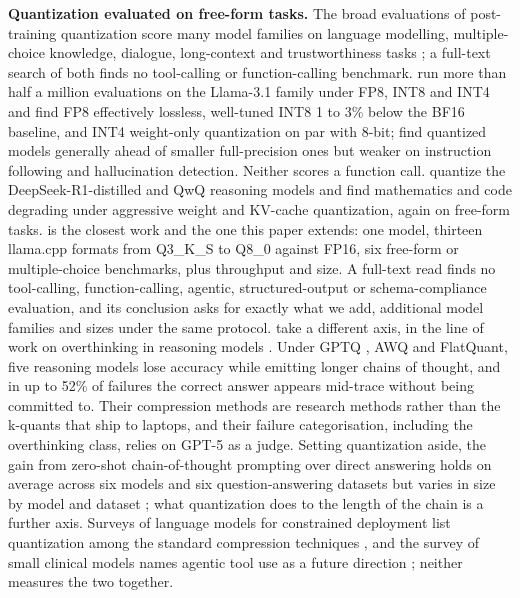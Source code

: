 \documentclass[12pt,letterpaper]{article}
\begin{document}
\textbf{Quantization evaluated on free-form tasks.} The broad evaluations of post-training quantization score many model families on language modelling, multiple-choice knowledge, dialogue, long-context and trustworthiness tasks \citep{jin2024comprehensive,li2024evaluating}; a full-text search of both finds no tool-calling or function-calling benchmark. \citet{kurtic2024bf16} run more than half a million evaluations on the Llama-3.1 family under FP8, INT8 and INT4 and find FP8 effectively lossless, well-tuned INT8 1 to 3\% below the BF16 baseline, and INT4 weight-only quantization on par with 8-bit; \citet{lee2024tradeoffs} find quantized models generally ahead of smaller full-precision ones but weaker on instruction following and hallucination detection. Neither scores a function call. \citet{liu2025quanthurts} quantize the DeepSeek-R1-distilled and QwQ reasoning models and find mathematics and code degrading under aggressive weight and KV-cache quantization, again on free-form tasks. \citet{kurt2026quant} is the closest work and the one this paper extends: one model, thirteen llama.cpp formats from Q3\_K\_S to Q8\_0 against FP16, six free-form or multiple-choice benchmarks, plus throughput and size. A full-text read finds no tool-calling, function-calling, agentic, structured-output or schema-compliance evaluation, and its conclusion asks for exactly what we add, additional model families and sizes under the same protocol. \citet{lotfi2026overthink} take a different axis, in the line of work on overthinking in reasoning models \citep{chen2024overthinking,sui2025stop}. Under GPTQ \citep{gptq2023}, AWQ \citep{awq2024} and FlatQuant, five reasoning models lose accuracy while emitting longer chains of thought, and in up to 52\% of failures the correct answer appears mid-trace without being committed to. Their compression methods are research methods rather than the k-quants that ship to laptops, and their failure categorisation, including the overthinking class, relies on GPT-5 as a judge. Setting quantization aside, the gain from zero-shot chain-of-thought prompting over direct answering holds on average across six models and six question-answering datasets but varies in size by model and dataset \citep{hebenstreit2024cot}; what quantization does to the length of the chain is a further axis. Surveys of language models for constrained deployment list quantization among the standard compression techniques \citep{turkmen2026slm,dincer2026edge}, and the survey of small clinical models names agentic tool use as a future direction \citep{turkmen2026slm}; neither measures the two together.
\end{document}
